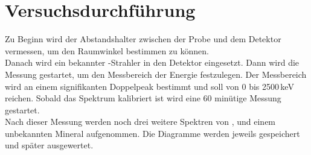 \section{Versuchsdurchführung}
Zu Beginn wird der Abstandshalter zwischen der Probe und dem Detektor vermessen, um den Raumwinkel bestimmen zu können. \\
Danach wird ein bekannter -Strahler in den Detektor eingesetzt. Dann wird die Messung gestartet, um den Messbereich der Energie festzulegen. Der Messbereich wird an einem signifikanten Doppelpeak bestimmt und soll von 0 bis 2500\,keV reichen. Sobald das Spektrum kalibriert ist wird eine 60 minütige Messung gestartet. \\
Nach dieser Messung werden noch drei weitere Spektren von ,  und einem unbekannten Mineral aufgenommen. Die Diagramme werden jeweils gespeichert und später ausgewertet.
